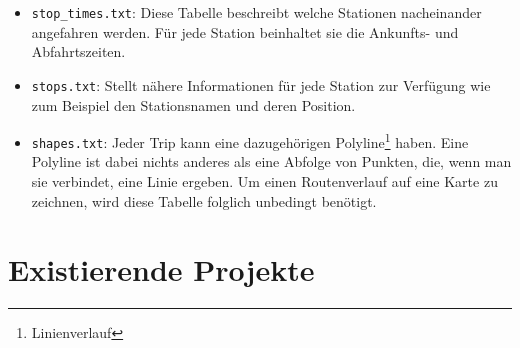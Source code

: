 \begin{newpage}
\begin{itemize}
			\item \texttt{stop\_times.txt}: Diese Tabelle beschreibt welche Stationen nacheinander angefahren werden. Für jede Station beinhaltet sie die Ankunfts- und Abfahrtszeiten.

			\item \texttt{stops.txt}: Stellt nähere Informationen für jede Station zur Verfügung wie zum Beispiel den Stationsnamen und deren Position.

			\item \texttt{shapes.txt}: Jeder Trip kann eine dazugehörigen Polyline\footnote{Linienverlauf} haben. Eine Polyline ist dabei nichts anderes als eine Abfolge von Punkten, die, wenn man sie verbindet, eine Linie ergeben. Um einen Routenverlauf auf eine Karte zu zeichnen, wird diese Tabelle folglich unbedingt benötigt. 
		\end{itemize}

	\section{Existierende Projekte}
	\label{sec:existierende_projekte}

\end{newpage}
